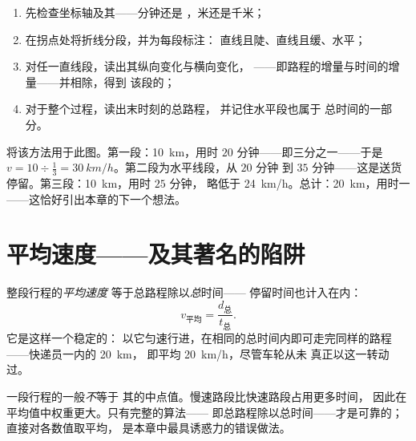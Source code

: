 \begin{method}\label{met:g7:motion-average-speed:read}
\begin{enumerate}
  \item 先检查坐标轴及其——分钟还是
        ，米还是千米；
  \item 在拐点处将折线分段，并为每段标注：
        直线且陡、直线且缓、水平；
  \item 对任一直线段，读出其纵向变化与横向变化，
        ——即路程的增量与时间的增量——并相除，得到
        该段的；
  \item 对于整个过程，读出末时刻的总路程，
        并记住水平段也属于
        总时间的一部分。
\end{enumerate}
\end{method}

\begin{example}[解读快递员的行程]\label{ex:g7:motion-average-speed:decoded}
将该方法用于此图。第一段：\qty{10}{km}，用时
$20$ 分钟——即三分之一——于是 $v = 10 \div
\tfrac{1}{3} = \qty{30}{km/h}$。第二段为水平线段，从 $20$ 分钟
到 $35$ 分钟——这是送货停留。第三段：\qty{10}{km}，用时 $25$ 分钟，
略低于 \qty{24}{km/h}。总计：\qty{20}{km}，用时一
——这恰好引出本章的下一个想法。
\end{example}

\section{平均速度——及其著名的陷阱}

\begin{definition}[平均速度]\label{def:g7:motion-average-speed:average}
整段行程的\emph{平均速度}
等于总路程除以\emph{总}时间——
停留时间也计入在内：
\[
v_{\text{平均}} = \frac{d_{\text{总}}}{t_{\text{总}}}.
\]
它是这样一个稳定的：
以它匀速行进，在相同的总时间内即可走完同样的路程——快递员一内的 \qty{20}{km}，
即平均 \qty{20}{km/h}，尽管车轮从未
真正以这一转动过。
\end{definition}

\begin{proposition}[陷阱]\label{prop:g7:motion-average-speed:trap}
一段行程的一般\emph{不}等于
其的中点值。慢速路段比快速路段占用更多时间，
因此在平均值中权重更大。只有完整的算法——
即总路程除以总时间——才是可靠的；
直接对各数值取平均，
是本章中最具诱惑力的错误做法。
\end{proposition}

